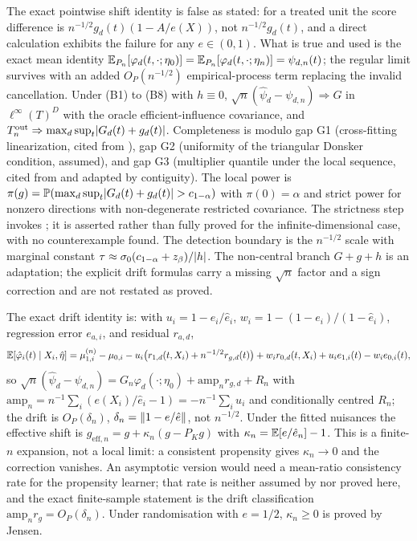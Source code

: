 The exact pointwise shift identity is false as stated: for a treated unit the score difference is $n^{-1/2}g_d(t)(1-A/e(X))$, not $n^{-1/2}g_d(t)$, and a direct calculation exhibits the failure for any $e\in(0,1)$. What is true and used is the exact mean identity $\mathbb{E}_{P_n}[\varphi_d(t,\cdot;\eta_0)]=\mathbb{E}_{P_n}[\varphi_d(t,\cdot;\eta_n)]=\psi_{d,n}(t)$; the regular limit survives with an added $O_P(n^{-1/2})$ empirical-process term replacing the invalid cancellation. Under (B1) to (B8) with $h\equiv0$, $\sqrt n(\hat\psi_d-\psi_{d,n})\Rightarrow G$ in $\ell^\infty(T)^D$ with the oracle efficient-influence covariance, and $T_n^{\mathrm{out}}\Rightarrow\max_d\sup_t\lvert G_d(t)+g_d(t)\rvert$. Completeness is modulo gap G1 (cross-fitting linearization, cited from \cite{chernozhukov_dml_2018,new_robins_2018}), gap G2 (uniformity of the triangular Donsker condition, assumed), and gap G3 (multiplier quantile under the local sequence, cited from \cite{cck_2013} and adapted by contiguity). The local power is $\pi(g)=\mathbb{P}(\max_d\sup_t\lvert G_d(t)+g_d(t)\rvert>c_{1-\alpha})$ with $\pi(0)=\alpha$ and strict power for nonzero directions with non-degenerate restricted covariance. The strictness step invokes \cite{anderson_1955,perlman_1988}; it is asserted rather than fully proved for the infinite-dimensional case, with no counterexample found. The detection boundary is the $n^{-1/2}$ scale with marginal constant $\tau\approx\sigma_0(c_{1-\alpha}+z_\beta)/\lvert h\rvert$. The non-central branch $G+g+h$ is an adaptation; the explicit drift formulas carry a missing $\sqrt n$ factor and a sign correction and are not restated as proved.

The exact drift identity is: with $u_i=1-e_i/\hat e_i$, $w_i=1-(1-e_i)/(1-\hat e_i)$, regression error $e_{a,i}$, and residual $r_{a,d}$,
\[
\mathbb{E}[\hat\varphi_i(t)\mid X_i,\hat\eta]=\mu^{(n)}_{1,i}-\mu_{0,i}-u_i\big(r_{1,d}(t,X_i)+n^{-1/2}r_{g,d}(t)\big)+w_ir_{0,d}(t,X_i)+u_ie_{1,i}(t)-w_ie_{0,i}(t),
\]
so $\sqrt n(\hat\psi_d-\psi_{d,n})=G_n\varphi_d(\cdot;\eta_0)+\mathrm{amp}_nr_{g,d}+R_n$ with $\mathrm{amp}_n=n^{-1}\sum_i(e(X_i)/\hat e_i-1)=-n^{-1}\sum_iu_i$ and conditionally centred $R_n$; the drift is $O_P(\delta_n)$, $\delta_n=\lVert 1-e/\hat e\rVert$, not $n^{-1/2}$. Under the fitted nuisances the effective shift is $g_{\mathrm{eff},n}=g+\kappa_n(g-P_Kg)$ with $\kappa_n=\mathbb{E}[e/\hat e_n]-1$. This is a finite-$n$ expansion, not a local limit: a consistent propensity gives $\kappa_n\to0$ and the correction vanishes. An asymptotic version would need a mean-ratio consistency rate for the propensity learner; that rate is neither assumed by \cite{kim_lee_tce_2026} nor proved here, and the exact finite-sample statement is the drift classification $\mathrm{amp}_nr_g=O_P(\delta_n)$. Under randomisation with $e=1/2$, $\kappa_n\ge0$ is proved by Jensen.

